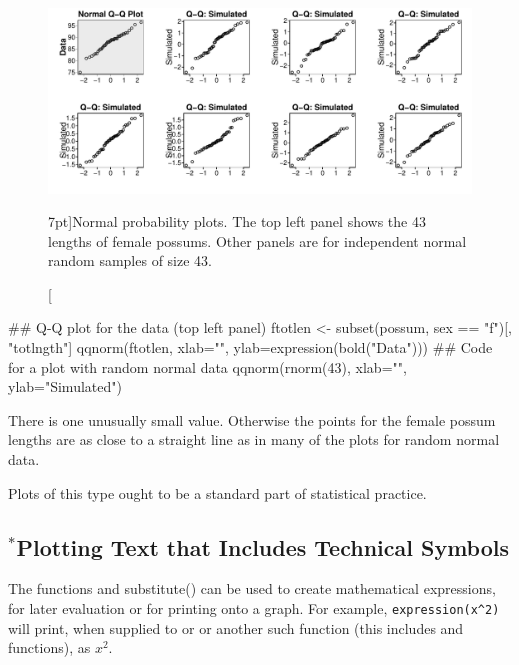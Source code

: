 \begin{figure}
\begin{Schunk}


\centerline{\includegraphics[width=\textwidth]{figs/07-possum-qqn-1} }

\end{Schunk}
 \caption[][7pt]{Normal probability plots. The top left panel
   shows the 43 lengths
of female possums. Other panels are for independent normal
random samples of size 43.\label{fig:np-plots}}
\vspace*{-24pt}

\end{figure}

\begin{Schunk}
\begin{Sinput}
## Q-Q plot for the data (top left panel)
ftotlen <- subset(possum, sex == "f")[, "totlngth"]
qqnorm(ftotlen, xlab="",
       ylab=expression(bold("Data")))
## Code for a plot with random normal data
qqnorm(rnorm(43), xlab="", ylab="Simulated")
\end{Sinput}
\end{Schunk}

\noindent There is one unusually small value.  Otherwise the points
for the female possum lengths are as close to a straight line as in
many of the plots for random normal data.

Plots of this type ought to be a standard part of statistical
practice.  

\subsection{$^*$Plotting Text that Includes Technical  Symbols}\label{sec:mathvec}

The functions  and {substitute()} can be used
to create mathematical expressions, for later evaluation or for
printing onto a graph.  For example, \verb+expression(x^2)+ will
print, when supplied to  or  or another
such function (this includes  and  functions),
as $x^2$.

